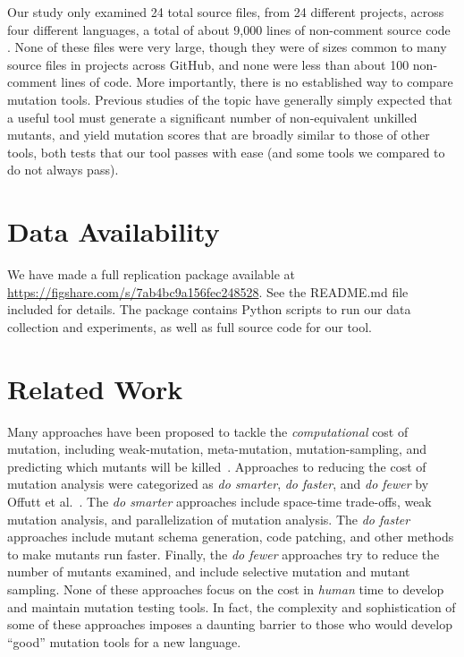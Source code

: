 \documentclass[acmsmall,screen,review,anonymous]{acmart}
\begin{document}
{Our study only examined 24 total source files, from 24 different projects, across four different
languages, a total of about 9,000 lines of non-comment source code .  None of these files were very large, though they were of
sizes common to many source files in projects across GitHub, and none
were less than about 100 non-comment lines of code.  More importantly,
there is no established way to compare mutation tools.
Previous studies of the topic have generally simply expected that a
useful tool must
generate a significant number of non-equivalent unkilled mutants, and
yield mutation scores that are broadly similar to those of other
tools, both tests that our tool passes with ease (and some tools we
compared to do not always pass).

\section{Data Availability}

We have made a full replication package available at
\url{https://figshare.com/s/7ab4bc9a156fec248528}.  See the README.md
file included for details.  The package contains Python scripts to run
our data collection and experiments, as well as full source
code for our tool.

\section{Related Work}

Many approaches have been proposed to tackle the \emph{computational} cost of mutation, including weak-mutation, 
meta-mutation, mutation-sampling, and predicting which mutants will be
killed~\cite{offuttMutant1996,
  untch1993mutation,KaufmanFAKAJ2022,zhang2016pmt}.  Approaches to reducing the cost of
mutation analysis were categorized as \textit{do smarter}, \textit{do
faster}, and \textit{do fewer} by Offutt et al.~\cite{offutt2001mutation}.
The \textit{do smarter} approaches include space-time trade-offs, weak
mutation analysis, and parallelization of mutation analysis. The \textit{do
faster} approaches include mutant schema generation, code patching, and
other methods to make mutants run faster. Finally, the
\textit{do fewer} approaches try to reduce the number of mutants examined,
and include selective mutation and mutant sampling.
None of these approaches focus on the cost in \emph{human} time to
develop and maintain mutation testing tools.  In fact, the complexity
and sophistication of some of these approaches imposes a daunting
barrier to those who would develop ``good'' mutation tools for a new
language.

}
\end{document}
